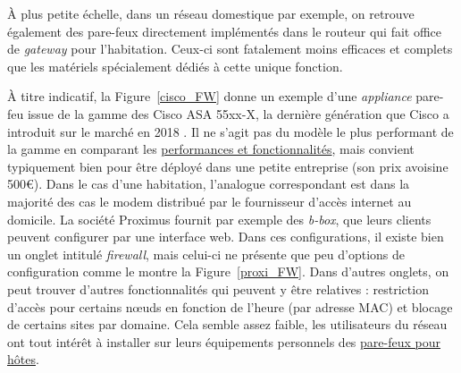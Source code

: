 \documentclass[]{article}
\begin{document}
\par À plus petite échelle, dans un réseau domestique par exemple, on retrouve également des pare-feux directement implémentés dans le routeur qui fait office de \textit{gateway} pour l'habitation. Ceux-ci sont fatalement moins efficaces et complets que les matériels spécialement dédiés à cette unique fonction.\\

\newpage

\par À titre indicatif, la Figure~\ref{cisco_FW} donne un exemple d'une \textit{appliance} pare-feu issue de la gamme des Cisco ASA 55xx-X, la dernière génération que Cisco a introduit sur le marché en 2018 \cite{wikiASA}. Il ne s'agit pas du modèle le plus performant de la gamme en comparant les \href{https://www.cisco.com/c/en/us/products/collateral/security/asa-5500-series-next-generation-firewalls/datasheet-c78-733916.html}{performances et fonctionnalités}, mais convient typiquement bien pour être déployé dans une petite entreprise (son prix avoisine 500\euro). Dans le cas d'une habitation, l'analogue correspondant est dans la majorité des cas le modem distribué par le fournisseur d'accès internet au domicile. La société Proximus fournit par exemple des \textit{b-box}, que leurs clients peuvent configurer par une interface web. Dans ces configurations, il existe bien un onglet intitulé \textit{firewall}, mais celui-ci ne présente que peu d'options de configuration comme le montre la Figure~\ref{proxi_FW}. Dans d'autres onglets, on peut trouver d'autres fonctionnalités qui peuvent y être relatives : restriction d'accès pour certains nœuds en fonction de l'heure (par adresse MAC) et blocage de certains sites par domaine. Cela semble assez faible, les utilisateurs du réseau ont tout intérêt à installer sur leurs équipements personnels des \hyperref[host_fw]{pare-feux pour hôtes}.
\end{document}
